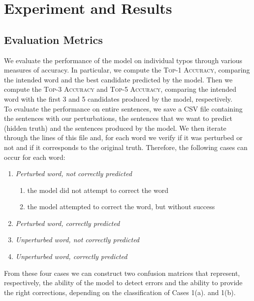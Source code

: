 \chapter{Experiment and Results}

\section{Evaluation Metrics}
We evaluate the performance of the model on individual typos through various measures of accuracy. In particular, we 
compute the \textsc{Top-1 Accuracy}, comparing the intended word and the best candidate predicted by the 
model. Then we compute the \textsc{Top-3 Accuracy} and \textsc{Top-5 Accuracy}, comparing the intended word 
with the first \num{3} and \num{5} candidates produced by the model, respectively.\\

To evaluate the performance on entire sentences, we save a CSV file containing the sentences with our perturbations, 
the sentences that we want to predict (hidden truth) and the sentences produced by the model. We then iterate through 
the lines of this file and, for each word we verify if it was perturbed or not and if it corresponds to the original 
truth. Therefore, the following cases can occur for each word:
\begin{enumerate}
	\item \textit{Perturbed word, not correctly predicted}
	\begin{enumerate}
		\item the model did not attempt to correct the word
		\item the model attempted to correct the word, but without success
	\end{enumerate}
	\item \textit{Perturbed word, correctly predicted}
	\item \textit{Unperturbed word, not correctly predicted}
	\item \textit{Unperturbed word, correctly predicted}
\end{enumerate}

From these four cases we can construct two confusion matrices that represent, respectively, the ability of the model to 
detect errors and the ability to provide the right corrections, depending on the classification of Cases 1(a). and 1(b).


